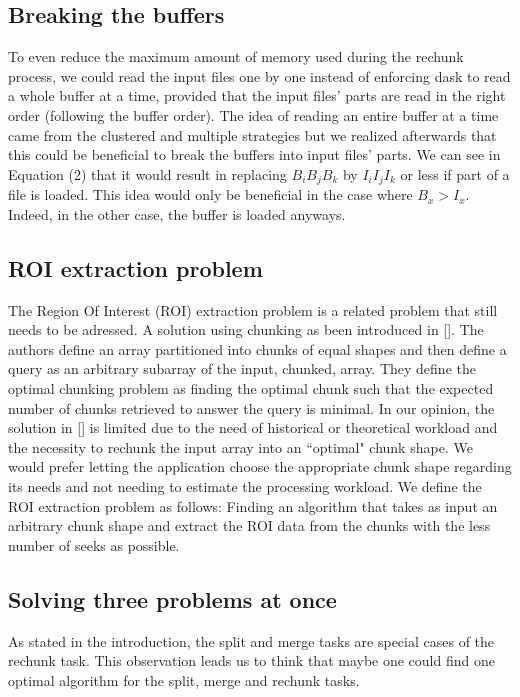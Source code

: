\documentclass[conference]{IEEEtran}
\begin{document}
\subsection{Breaking the buffers}
To even reduce the maximum amount of memory used during the rechunk process, we
could read the input files one by one instead of enforcing dask to read a whole
buffer at a time, provided that the input files' parts are read in the right
order (following the buffer order). The idea of reading an entire buffer at a
time came from the clustered and multiple strategies but we realized afterwards
that this could be beneficial to break the buffers into input files' parts. We
can see in Equation (2) that it would result in replacing $B_iB_jB_k$ by
$I_iI_jI_k$ or less if part of a file is loaded. This idea would only be
beneficial in the case where $B_x>I_x$. Indeed, in the other case, the buffer is
loaded anyways.

\subsection{ROI extraction problem}
The Region Of Interest (ROI) extraction problem is a related problem that still needs
to be adressed. A solution using chunking as been introduced in []. The authors
define an array partitioned into chunks of equal shapes and then define a
query as an arbitrary subarray of the input, chunked, array. They define the
optimal chunking problem as finding the optimal chunk such that the expected
number of chunks retrieved to answer the query is minimal. In our opinion, the
solution in [] is limited due to the need of historical or theoretical workload
and the necessity to rechunk the input array into an ``optimal" chunk shape. We
would prefer letting the application choose the appropriate chunk shape
regarding its needs and not needing to estimate the processing workload. We
define the ROI extraction problem as follows: Finding an algorithm that takes
as input an arbitrary chunk shape and extract the ROI data from the chunks with
the less number of seeks as possible.

\subsection{Solving three problems at once}
As stated in the introduction, the split and merge tasks are special cases of
the rechunk task. This observation leads us to think that maybe one could find
one optimal algorithm for the split, merge and rechunk tasks.
\end{document}
